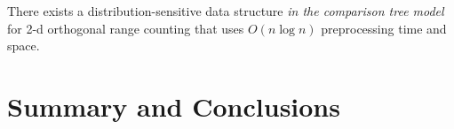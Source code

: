 \documentclass{patmorin}
\begin{document}
\begin{thm}
  There exists a distribution-sensitive data structure \emph{in the
  comparison tree model} for 2-d orthogonal range counting that uses
  $O(n\log n)$ preprocessing time and space.
\end{thm}




\section{Summary and Conclusions}





\end{document}
